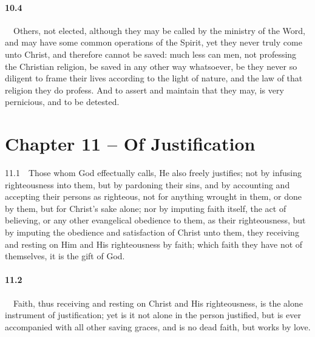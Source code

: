 \paragraph{10.4}\ \ Others, not elected, although they may be called by the ministry of the Word, and may have some common operations of the Spirit, yet they never truly come unto Christ, and therefore cannot be saved: much less can men, not professing the Christian religion, be saved in any other way whatsoever, be they never so diligent to frame their lives according to the light of nature, and the law of that religion they do profess. And to assert and maintain that they may, is very pernicious, and to be detested.  

\section{Chapter 11 -- Of Justification} 11.1\ \ Those whom God effectually calls, He also freely justifies; not by infusing righteousness into them, but by pardoning their sins, and by accounting and accepting their persons as righteous, not for anything wrought in them, or done by them, but for Christ's sake alone; nor by imputing faith itself, the act of believing, or any other evangelical obedience to them, as their righteousness, but by imputing the obedience and satisfaction of Christ unto them, they receiving and resting on Him and His righteousness by faith; which faith they have not of themselves, it is the gift of God.   
\bigskip
\paragraph{11.2}\ \ Faith, thus receiving and resting on Christ and His righteousness, is the alone instrument of justification; yet is it not alone in the person justified, but is ever accompanied with all other saving graces, and is no dead faith, but works by love.   
\bigskip
